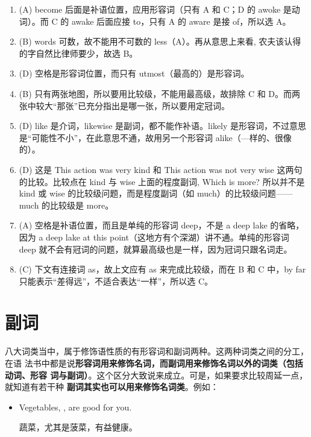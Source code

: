 \begin{enumerate}
\item (A) become 后面是补语位置，应用形容词（只有 A 和 C；D 的 awoke 是动词）。而 C 的 awake 后面应接 to，只有 A 的 aware 是接 of，所以选 A。
\item (B) words 可数，故不能用不可数的 less（A）。再从意思上来看, 农夫该认得的字自然比律师要少，故选 B。

\item  (D) 空格是形容词位置，而只有 utmost（最高的）是形容词。

\item  (B) 只有两张地图，所以要用比较级，不能用最高级，故排除 C 和 D。而两张中较大“那张”已充分指出是哪一张，所以要用定冠词。

\item  (D) like 是介词，likewise 是副词，都不能作补语。likely 是形容词，不过意思是“可能性不小”，在此意思不通，故用另一个形容词 alike（—样的、很像的）。

\item (D) 这是 This action was very kind 和 This action was not very wise 这两句的比较。比较点在 kind 与 wise 上面的程度副词, Which is more? 所以并不是 kind 或 wise 的比较级问题，而是程度副词（如 much）的比较级问题——much 的比较级是 more。

\item (A) 空格是补语位置，而且是单纯的形容词 deep，不是 a deep lake 的省略，因为 a deep lake at this point（这地方有个深湖）讲不通。单纯的形容词 deep 就不会有冠词的问题，就算最高级也是一样，因为冠词只跟名词走。

\item (C) 下文有连接词 as，故上文应有 as 来完成比较级，而在 B 和 C 中，by far 只能表示“差得远”，不适合表达“一样”，所以选 C。
\end{enumerate}

\chapter{副词}

八大词类当中，属于修饰语性质的有形容词和副词两种。这两种词类之间的分工，在语
法书中都是说\textbf{形容词用来修饰名词，而副词用来修饰名词以外的词类（包括动词、形容
  词与副词）}。这个区分大致说来成立。可是，如果要求比较周延一点，就知道有若干种
\textbf{副词其实也可以用来修饰名词类}。例如：

\begin{itemize}
\item  Vegetables, , are good for you.

  蔬菜，尤其是菠菜，有益健康。
\end{itemize}

